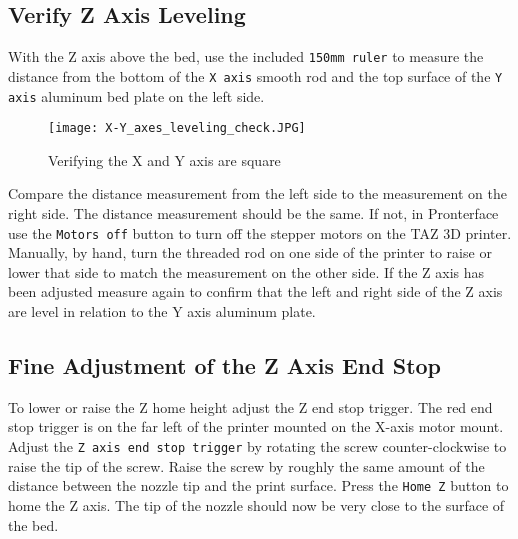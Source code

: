 \subsection{Verify Z Axis Leveling}
With the Z axis above the bed, use the included \texttt{150mm ruler} to measure the distance from the bottom of the \texttt{X axis} smooth rod and the top surface of the \texttt{Y axis} aluminum bed plate on the left side.
\begin{figure}[H]
\centering
\texttt{[image: X-Y\_axes\_leveling\_check.JPG]}
\caption{Verifying the X and Y axis are square}
\label{fig:X-Y_axes_leveling_check}
\end{figure} 
Compare the distance measurement from the left side to the measurement on the right side. The distance measurement should be the same. If not, in Pronterface use the \texttt{Motors off} button to turn off the stepper motors on the TAZ 3D printer. Manually, by hand, turn the threaded rod on one side of the printer to raise or lower that side to match the measurement on the other side. If the Z axis has been adjusted measure again to confirm that the left and right side of the Z axis are level in relation to the Y axis aluminum plate.


\subsection{Fine Adjustment of the Z Axis End Stop}
\begin{comment}
\begin{figure}[H]
\centering
\texttt{[image: Z\_end\_stop\_trigger.JPG]}
\caption{Z end stop trigger}
\label{fig:Z_end_stop_trigger}
\end{figure}
\end{comment}
To lower or raise the Z home height adjust the Z end stop trigger. The red end stop trigger is on the far left of the printer mounted on the X-axis motor mount.
Adjust the \texttt{Z axis end stop trigger} by rotating the screw counter-clockwise to raise the tip of the screw. Raise the screw by roughly the same amount of the distance between the nozzle tip and the print surface. Press the \texttt{Home Z} button to home the Z axis. The tip of the nozzle should now be very close to the surface of the bed.

